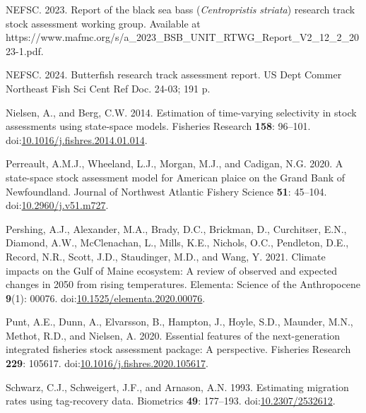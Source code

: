 \documentclass[
]{article}
\newlength{\cslhangindent}
\newlength{\cslentryspacingunit} %
\newenvironment{CSLReferences}[2] %
 {%
  \setlength{\parindent}{0pt}
  \ifodd #1
  \let\oldpar\par
  \def\par{\hangindent=\cslhangindent\oldpar}
  \fi
  \setlength{\parskip}{#2\cslentryspacingunit}
 }%
 {}
\begin{document}
\begin{CSLReferences}{1}{0}
\leavevmode{}%
NEFSC. 2023. Report of the black sea bass (\emph{{C}entropristis}
\emph{striata}) research track stock assessment working group.
{Available} at
https://www.mafmc.org/s/a\_2023\_BSB\_UNIT\_RTWG\_Report\_V2\_12\_2\_2023-1.pdf.

\leavevmode{}%
NEFSC. 2024. Butterfish research track assessment report. US Dept Commer
Northeast Fish Sci Cent Ref Doc. 24-03; 191 p.

\leavevmode{}%
Nielsen, A., and Berg, C.W. 2014. Estimation of time-varying selectivity
in stock assessments using state-space models. Fisheries Research
\textbf{158}: 96--101.
doi:\href{https://doi.org/10.1016/j.fishres.2014.01.014}{10.1016/j.fishres.2014.01.014}.

\leavevmode{}%
Perreault, A.M.J., Wheeland, L.J., Morgan, M.J., and Cadigan, N.G. 2020.
A state-space stock assessment model for {American} plaice on the
{Grand} {Bank} of {Newfoundland}. Journal of Northwest Atlantic Fishery
Science \textbf{51}: 45--104.
doi:\href{https://doi.org/10.2960/j.v51.m727}{10.2960/j.v51.m727}.

\leavevmode{}%
Pershing, A.J., Alexander, M.A., Brady, D.C., Brickman, D., Curchitser,
E.N., Diamond, A.W., McClenachan, L., Mills, K.E., Nichols, O.C.,
Pendleton, D.E., Record, N.R., Scott, J.D., Staudinger, M.D., and Wang,
Y. 2021. Climate impacts on the {G}ulf of {M}aine ecosystem: A review of
observed and expected changes in 2050 from rising temperatures.
Elementa: Science of the Anthropocene \textbf{9}(1): 00076.
doi:\href{https://doi.org/10.1525/elementa.2020.00076}{10.1525/elementa.2020.00076}.

\leavevmode{}%
Punt, A.E., Dunn, A., Elvarsson, B., Hampton, J., Hoyle, S.D., Maunder,
M.N., Methot, R.D., and Nielsen, A. 2020. Essential features of the
next-generation integrated fisheries stock assessment package: A
perspective. Fisheries Research \textbf{229}: 105617.
doi:\href{https://doi.org/10.1016/j.fishres.2020.105617}{10.1016/j.fishres.2020.105617}.

\leavevmode{}%
Schwarz, C.J., Schweigert, J.F., and Arnason, A.N. 1993. Estimating
migration rates using tag-recovery data. Biometrics \textbf{49}:
177--193. doi:\href{https://doi.org/10.2307/2532612}{10.2307/2532612}.


\end{CSLReferences}
\end{document}
